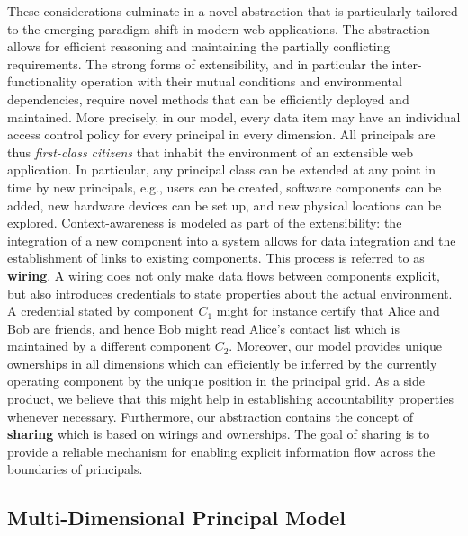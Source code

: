 \documentclass{src/acm_proc_article-sp} \else
\begin{document}
These considerations culminate in a novel abstraction that
is particularly tailored to the emerging paradigm shift in
modern web applications.
The abstraction allows for efficient reasoning and
maintaining the partially conflicting requirements. The
strong forms of extensibility, and in particular the
inter-functionality operation with their mutual conditions
and environmental dependencies, require novel methods that
can be efficiently deployed and maintained.
More precisely, in our model, every data item may have an
individual access control policy for every principal in
every dimension.
All principals are thus \emph{first-class citizens} that
inhabit the environment of an extensible web application.
In particular, any principal class can be extended at any
point in time by new principals, e.g., users can be created,
software components can be added, new hardware devices can
be set up, and new physical locations can be explored.
Context-awareness is modeled as part of the extensibility:
the integration of a new component into a system allows for
data integration and the establishment of links to existing
components. This process is referred to as \textbf{wiring}.
A wiring does not only make data flows between components
explicit, but also introduces credentials to state
properties about the actual environment. A credential stated
by component $C_1$ might for instance certify that Alice and
Bob are friends, and hence Bob might read Alice's contact list
which is maintained by a different component $C_2$.
Moreover, our model provides unique ownerships in all
dimensions which can efficiently be inferred by the
currently operating component by the unique position in the
principal grid. As a side product, we believe that this
might help in establishing accountability properties
whenever necessary.
Furthermore, our abstraction contains the concept of
\textbf{sharing} which is based on wirings and ownerships.
The goal of sharing is to provide a reliable mechanism for
enabling explicit information flow across the boundaries of
principals.















\subsection{Multi-Dimensional Principal Model}
\end{document}
